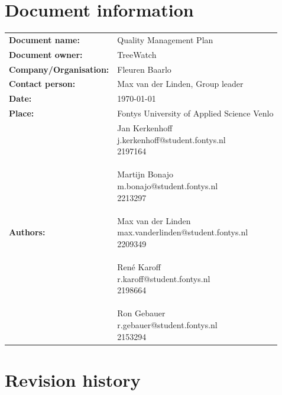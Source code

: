 \documentclass[12pt]{article}
\begin{document}
\section*{Document information}
\begin{tabular}{ll}
	\textbf{Document name:} & Quality Management Plan\\
	\textbf{Document owner:} & TreeWatch \\
	\textbf{Company/Organisation:} & Fleuren Baarlo \\
	\textbf{Contact person:} & Max van der Linden, Group leader \\
	\textbf{Date:} & \today \\
	\textbf{Place:} & Fontys University of Applied Science Venlo \\
	\textbf{Authors:} & \parbox[t]{5cm}{
		Jan Kerkenhoff\\ j.kerkenhoff@student.fontys.nl\\ 2197164 \\ \\
		Martijn Bonajo\\ m.bonajo@student.fontys.nl\\ 2213297 \\ \\
		Max van der Linden\\ max.vanderlinden@student.fontys.nl\\ 2209349 \\ \\
		René Karoff\\ r.karoff@student.fontys.nl\\ 2198664 \\ \\
		Ron Gebauer\\ r.gebauer@student.fontys.nl\\ 2153294 \\ }
\end{tabular}
\clearpage
\section*{Revision history}
\end{document}
